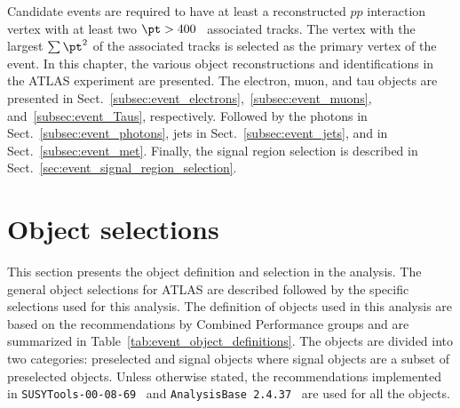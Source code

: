 Candidate events are required to have at least a reconstructed $pp$ interaction vertex with at least two $\pt > 400$~{\MeV} associated tracks.
The vertex with the largest $\sum \pt^{2}$ of the associated tracks is selected as the primary vertex of the event. 
In this chapter, the various object reconstructions and  identifications in the ATLAS experiment are presented.
The electron, muon, and tau objects are presented in Sect.~\ref{subsec:event_electrons},~\ref{subsec:event_muons}, and~\ref{subsec:event_Taus}, respectively.
Followed by the photons in Sect.~\ref{subsec:event_photons}, jets in Sect.~\ref{subsec:event_jets}, and \met in Sect.~\ref{subsec:event_met}.
Finally, the signal region selection is described in Sect.~\ref{sec:event_signal_region_selection}.


\section{Object selections}
\label{sec:event_object_selections}
This section presents the object definition and selection in the analysis.
The general object selections for ATLAS are described followed by the specific selections used for this analysis.
The definition of objects used in this analysis are based on the recommendations by Combined Performance groups and are summarized in Table~\ref{tab:event_object_definitions}.
The objects are divided into two categories: preselected and signal objects where signal objects are a subset of preselected objects.
Unless otherwise stated, the recommendations implemented in \texttt{SUSYTools-00-08-69}~\cite{SUSYToolsV8} and \texttt{AnalysisBase 2.4.37}~\cite{AnalysisBase} are used for all the objects.

